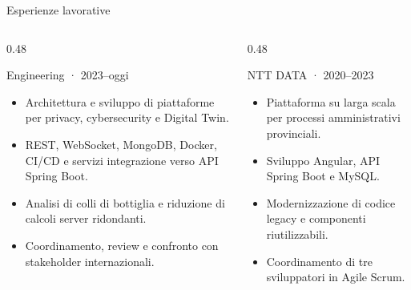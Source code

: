 \documentclass[aspectratio=169,11pt]{beamer}
\begin{document}
\begin{frame}{Esperienze lavorative}
  \begin{columns}[T,onlytextwidth]
    \begin{column}{0.48\textwidth}
      \begin{block}{Engineering · 2023--oggi}
        \begin{itemize}
          \item Architettura e sviluppo di piattaforme per privacy, cybersecurity e Digital Twin.
          \item REST, WebSocket, MongoDB, Docker, CI/CD e servizi integrazione verso API Spring Boot.
          \item Analisi di colli di bottiglia e riduzione di calcoli server ridondanti.
          \item Coordinamento, review e confronto con stakeholder internazionali.
        \end{itemize}
      \end{block}
    \end{column}
    \begin{column}{0.48\textwidth}
      \begin{block}{NTT DATA · 2020--2023}
        \begin{itemize}
          \item Piattaforma su larga scala per processi amministrativi provinciali.
          \item Sviluppo Angular, API Spring Boot e MySQL.
          \item Modernizzazione di codice legacy e componenti riutilizzabili.
          \item Coordinamento di tre sviluppatori in Agile Scrum.
        \end{itemize}
      \end{block}
    \end{column}
  \end{columns}
\end{frame}
\end{document}
